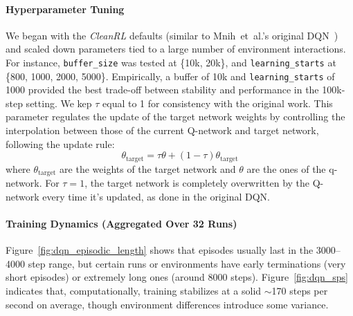 \paragraph{Hyperparameter Tuning}
We began with the \emph{CleanRL} defaults (similar to Mnih~et~al.'s original DQN~\cite{mnih:atari}) and
scaled down parameters tied to a large number of environment interactions. For instance,
\texttt{buffer\_size} was tested at \{10k, 20k\}, and \texttt{learning\_starts} 
at \{800, 1000, 2000, 5000\}. Empirically, a buffer of 10k 
and \texttt{learning\_starts} of 1000 provided the best trade-off between stability 
and performance in the 100k-step setting. We kep $\tau$ equal to \num{1} for consistency with the original work.
This parameter regulates the update of the target network weights by controlling the interpolation between those of the 
current Q-network and target network, following the update rule:
$$
\theta_{\text{target}} = \tau \theta + (1 - \tau) \theta_{\text{target}}
$$
where $\theta_{\text{target}}$ are the weights of the target network and $\theta$ are the ones of the q-network.
For \(\tau = 1\), the target network is completely overwritten by the Q-network 
every time it's updated, as done in the original DQN.

\paragraph{Training Dynamics (Aggregated Over 32 Runs)}
Figure~\ref{fig:dqn_episodic_length} shows that episodes usually last in the 3000--4000 step range, 
but certain runs or environments have early terminations (very short episodes) or extremely long ones (around 8000 steps).  
Figure~\ref{fig:dqn_sps} indicates that, computationally, training stabilizes at a solid 
\(\sim\)170 steps per second on average, though environment differences introduce some variance.

